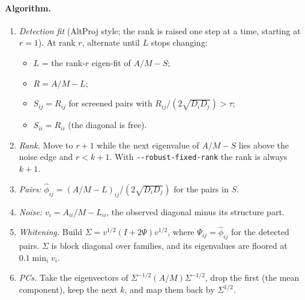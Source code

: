 \documentclass[11pt,a4paper]{article}
\newcommand{\opt}[1]{\texttt{-{}-#1}}
\begin{document}
\paragraph{Algorithm.}
\begin{enumerate}
  \item \emph{Detection fit} (AltProj style; the rank is raised one step at a
    time, starting at $r=1$). At rank $r$, alternate until $L$ stops
    changing:
    \begin{itemize}
      \item $L$ = the rank-$r$ eigen-fit of $A/M-S$;
      \item $R=A/M-L$;
      \item $S_{ij}=R_{ij}$ for screened pairs with $R_{ij}/(2\sqrt{D_iD_j})>\tau$;
      \item $S_{ii}=R_{ii}$ (the diagonal is free).
    \end{itemize}
  \item \emph{Rank.} Move to $r+1$ while the next eigenvalue of $A/M-S$ lies
    above the noise edge and $r<k+1$. With \opt{robust-fixed-rank} the rank
    is always $k+1$.
  \item \emph{Pairs:} $\hat\phi_{ij}=(A/M-L)_{ij}/(2\sqrt{D_iD_j})$ for the pairs
    in $S$.
  \item \emph{Noise:} $v_i=A_{ii}/M-L_{ii}$, the observed diagonal minus its
    structure part.
  \item \emph{Whitening.} Build
    $\Sigma=v^{1/2}(I+2\Psi)v^{1/2}$, where $\Psi_{ij}=\hat\phi_{ij}$ for the
    detected pairs. $\Sigma$ is block diagonal over families, and its
    eigenvalues are floored at $0.1\min_iv_i$.
  \item \emph{PCs.} Take the eigenvectors of
    $\Sigma^{-1/2}(A/M)\Sigma^{-1/2}$, drop the first (the mean component),
    keep the next $k$, and map them back by $\Sigma^{1/2}$.
\end{enumerate}
\end{document}
